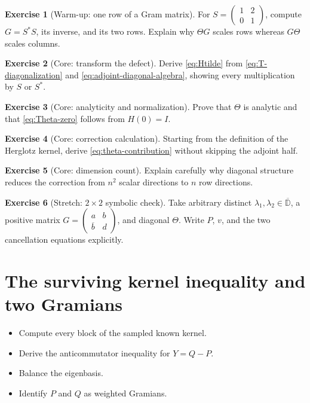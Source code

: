 \documentclass[11pt,oneside,openany]{book}
\theoremstyle{definition}
\newtheorem{exercise}{Exercise}[chapter]
\theoremstyle{remark}
\newcommand{\D}{\mathbb D}
\newcommand{\olD}{\overline{\D}}
\begin{document}
\begin{exercise}[Warm-up: one row of a Gram matrix]
For
\(
S=\begin{pmatrix}1&2\\0&1\end{pmatrix}
\),
compute \(G=S^*S\), its inverse, and its two rows.  Explain why
\(\Theta G\) scales rows whereas \(G\Theta\) scales columns.
\end{exercise}

\begin{exercise}[Core: transform the defect]
Derive \eqref{eq:Htilde} from
\eqref{eq:T-diagonalization} and
\eqref{eq:adjoint-diagonal-algebra}, showing every multiplication by
\(S\) or \(S^*\).
\end{exercise}

\begin{exercise}[Core: analyticity and normalization]
Prove that \(\Theta\) is analytic and that
\eqref{eq:Theta-zero} follows from \(H(0)=I\).
\end{exercise}

\begin{exercise}[Core: correction calculation]
\label{ex:theta-cancel}
Starting from the definition of the Herglotz kernel, derive
\eqref{eq:theta-contribution} without skipping the adjoint half.
\end{exercise}

\begin{exercise}[Core: dimension count]
Explain carefully why diagonal structure reduces the correction from
\(n^2\) scalar directions to \(n\) row directions.
\end{exercise}

\begin{exercise}[Stretch: \(2\times2\) symbolic check]
Take arbitrary distinct
\(\lambda_1,\lambda_2\in\olD\), a positive matrix
\(G=\begin{pmatrix}a&b\\\overline b&d\end{pmatrix}\), and diagonal
\(\Theta\).  Write \(P\), \(v\), and the two cancellation equations
explicitly.
\end{exercise}

\chapter{The surviving kernel inequality and two Gramians}
\label{ch:gramian-inequality}

\begin{learninggoals}
\begin{itemize}
  \item Compute every block of the sampled known kernel.
  \item Derive the anticommutator inequality for \(Y=Q-P\).
  \item Balance the eigenbasis.
  \item Identify \(P\) and \(Q\) as weighted Gramians.
\end{itemize}
\end{learninggoals}
\end{document}
